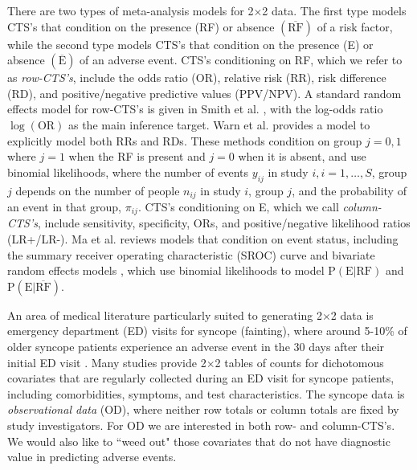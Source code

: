 \documentclass[AMA,STIX1COL]{WileyNJD-v2}
\newcommand{\E}{\mbox{E}}
\newcommand{\RF}{\mbox{RF}}
\newcommand{\Ebar}{\overline{\mbox{E}}}
\newcommand{\RFbar}{\overline{\mbox{RF}}}
\begin{document}
There are two types of meta-analysis models for 2$\times$2 data. The first type models CTS's that condition on the presence (RF) or absence $(\RFbar)$ of a risk factor, while the second type models CTS's that condition on the presence (E) or absence $(\Ebar)$ of an adverse event. CTS's conditioning on RF, which we refer to as \textit{row-CTS's}, include the odds ratio (OR), relative risk (RR), risk difference (RD), and positive/negative predictive values (PPV/NPV). A standard random effects model for row-CTS's is given in Smith et al. \cite{smith1995}, with the log-odds ratio $\log(\mbox{OR})$ as the main inference target. Warn et al. \cite{warn2002} provides a model to explicitly model both RRs and RDs. These methods condition on group $j = 0, 1$ where $j=1$ when the RF is present and $j=0$ when it is absent, and use binomial likelihoods, where the number of events $y_{ij}$ in study $i, i = 1, \dots, S$, group $j$ depends on the number of people $n_{ij}$ in study $i$, group $j$, and the probability of an event in that group, $\pi_{ij}$. CTS's conditioning on E, which we call \textit{column-CTS's}, include sensitivity, specificity, ORs, and positive/negative likelihood ratios (LR+/LR-). Ma et al. \cite{ma2016} reviews models that condition on event status, including the summary receiver operating characteristic (SROC) curve \cite{rutter2001, moses1993} and bivariate random effects models \cite{reitsma2005, chu2006, arends2008}, which use binomial likelihoods to model $\mbox{P}(\E \vert \RF)$ and $\mbox{P}(\E \vert \RFbar)$. 

An area of medical literature particularly suited to generating 2$\times$2 data is emergency department (ED) visits for syncope (fainting), where around 5-10\% of older syncope patients experience an adverse event in the 30 days after their initial ED visit \cite{gibson2018}. Many studies provide 2$\times$2 tables of counts for dichotomous covariates that are regularly collected during an ED visit for syncope patients, including comorbidities, symptoms, and test characteristics. The syncope data is \textit{observational data} (OD), where neither row totals or column totals are fixed by study investigators. For OD we are interested in both row- and column-CTS's. We would also like to ``weed out" those covariates that do not have diagnostic value in predicting adverse events. 
\end{document}
